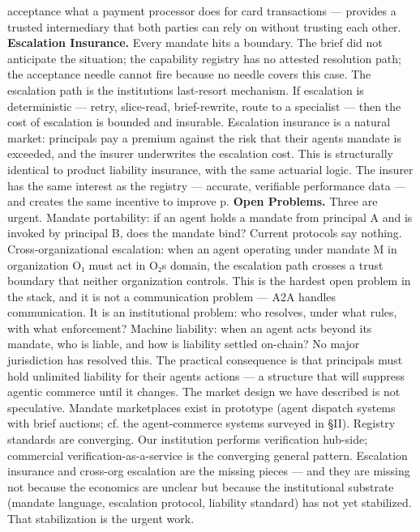 \documentclass[
]{article}
\begin{document}
acceptance what a payment processor does for card transactions ---
provides a trusted intermediary that both parties can rely on without
trusting each other. \textbf{Escalation Insurance.} Every mandate hits a
boundary. The brief did not anticipate the situation; the capability
registry has no attested resolution path; the acceptance needle cannot
fire because no needle covers this case. The escalation path is the
institution\textquotesingle s last-resort mechanism. If escalation is
deterministic --- retry, slice-read, brief-rewrite, route to a
specialist --- then the cost of escalation is bounded and insurable.
Escalation insurance is a natural market: principals pay a premium
against the risk that their agent\textquotesingle s mandate is exceeded,
and the insurer underwrites the escalation cost. This is structurally
identical to product liability insurance, with the same actuarial logic.
The insurer has the same interest as the registry --- accurate,
verifiable performance data --- and creates the same incentive to
improve p. \textbf{Open Problems.} Three are urgent. Mandate
portability: if an agent holds a mandate from principal A and is invoked
by principal B, does the mandate bind? Current protocols say nothing.
Cross-organizational escalation: when an agent operating under mandate M
in organization O₁ must act in O₂\textquotesingle s domain, the
escalation path crosses a trust boundary that neither organization
controls. This is the hardest open problem in the stack, and it is not a
communication problem --- A2A handles communication. It is an
institutional problem: who resolves, under what rules, with what
enforcement? Machine liability: when an agent acts beyond its mandate,
who is liable, and how is liability settled on-chain? No major
jurisdiction has resolved this. The practical consequence is that
principals must hold unlimited liability for their
agents\textquotesingle{} actions --- a structure that will suppress
agentic commerce until it changes. The market design we have described
is not speculative. Mandate marketplaces exist in prototype (agent
dispatch systems with brief auctions; cf. the agent-commerce systems
surveyed in §II). Registry standards are converging. Our institution
performs verification hub-side; commercial verification-as-a-service is
the converging general pattern. Escalation insurance and cross-org
escalation are the missing pieces --- and they are missing not because
the economics are unclear but because the institutional substrate
(mandate language, escalation protocol, liability standard) has not yet
stabilized. That stabilization is the urgent work.
\end{document}
